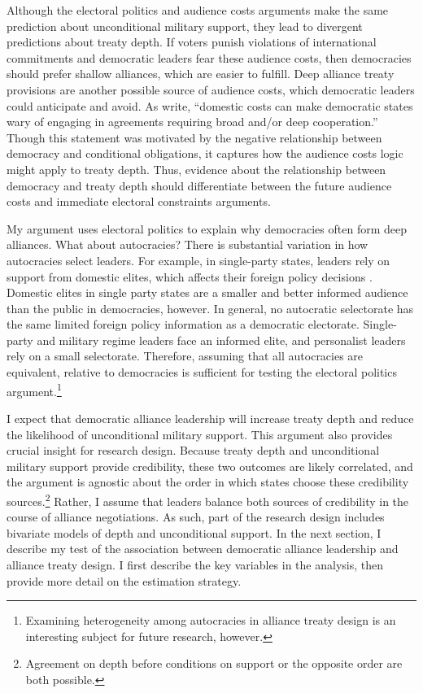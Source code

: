 \documentclass[12pt]{article}
\begin{document}
Although the electoral politics and audience costs arguments make the same prediction about unconditional military support, they lead to divergent predictions about treaty depth. 
If voters punish violations of international commitments and democratic leaders fear these audience costs, then democracies should prefer shallow alliances, which are easier to fulfill. 
Deep alliance treaty provisions are another possible source of audience costs, which democratic leaders could anticipate and avoid.
As \citet[pg. 980]{Chibaetal2015} write, ``domestic costs can make democratic states wary of engaging in agreements requiring broad and/or deep cooperation.''  
Though this statement was motivated by the negative relationship between democracy and conditional obligations, it captures how the audience costs logic might apply to treaty depth. 
Thus, evidence about the relationship between democracy and treaty depth should differentiate between the future audience costs and immediate electoral constraints arguments. 


My argument uses electoral politics to explain why democracies often form deep alliances. 
What about autocracies? 
There is substantial variation in how autocracies select leaders. 
For example, in single-party states, leaders rely on support from domestic elites, which affects their foreign policy decisions \citep{Weeks2014}.
Domestic elites in single party states are a smaller and better informed audience than the public in democracies, however.   
In general, no autocratic selectorate has the same limited foreign policy information as a democratic electorate.
Single-party and military regime leaders face an informed elite, and personalist leaders rely on a small selectorate. 
Therefore, assuming that all autocracies are equivalent, relative to democracies is sufficient for testing the electoral politics argument.\footnote{Examining heterogeneity among autocracies in alliance treaty design is an interesting subject for future research, however.} 


I expect that democratic alliance leadership will increase treaty depth and reduce the likelihood of unconditional military support. 
This argument also provides crucial insight for research design. 
Because treaty depth and unconditional military support provide credibility, these two outcomes are likely correlated, and the argument is agnostic about the order in which states choose these credibility sources.\footnote{Agreement on depth before conditions on support or the opposite order are both possible.}
Rather, I assume that leaders balance both sources of credibility in the course of alliance negotiations. 
As such, part of the research design includes bivariate models of depth and unconditional support. 
In the next section, I describe my test of the association between democratic alliance leadership and alliance treaty design. 
I first describe the key variables in the analysis, then provide more detail on the estimation strategy.
\end{document}
